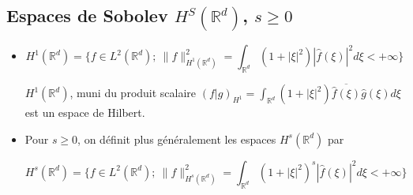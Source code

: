 \documentclass[10pt,a4paper,oneside]{article}
\begin{document}
\subsection{Espaces de Sobolev $H^S(\mathbb{R}^d)$, $s \geq 0$}

\begin{itemize}
\item
\[ H^1(\mathbb{R}^d) = \{ f \in L^2(\mathbb{R}^d);\ \| f \|^2_{H^1(\mathbb{R}^d)} = \int_{\mathbb{R}^d} (1 + |\xi|^2) |\hat{f}(\xi)|^2 d\xi < +\infty \} \]

$H^1(\mathbb{R}^d)$, muni du produit scalaire $(f | g)_{H^1} = \int_{\mathbb{R}^d} (1 + |\xi|^2) \overline{\hat{f}(\xi)} \hat{g}(\xi) d\xi$ est un espace de Hilbert.

\item
Pour $s \geq 0$, on définit plus généralement les espaces $H^s(\mathbb{R}^d)$ par

\[ H^s(\mathbb{R}^d) = \{ f \in L^2(\mathbb{R}^d);\ \| f \|^2_{H^s(\mathbb{R}^d)} = \int_{\mathbb{R}^d} (1 + |\xi|^2)^s |\hat{f}(\xi)|^2 d\xi < +\infty\} \]
\end{itemize}
\end{document}
